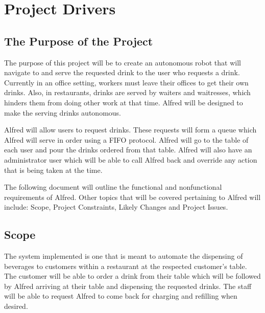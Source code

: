 \documentclass [11pt]{article}
\begin{document}
\pagebreak



\section {\textbf{Project Drivers}}

\subsection{The Purpose of the Project} 
The purpose of this project will be to create an autonomous robot that will navigate to and serve the requested drink to the user who requests a drink. Currently in an office setting, workers must leave their offices to get their own drinks. Also, in restaurants, drinks are served by waiters and waitresses, which hinders them from doing other work at that time. Alfred will be designed to make the serving drinks autonomous. \newline

Alfred will allow users to request drinks. These requests will form a queue which Alfred will serve in order using a FIFO protocol. Alfred will go to the table of each user and pour the drinks ordered from that table. Alfred will also have an administrator user which will be able to call Alfred back and override any action that is being taken at the time.\newline

The following document will outline the functional and nonfunctional requirements of Alfred.  Other topics that will be covered pertaining to Alfred will include: Scope, Project Constraints, Likely Changes and Project Issues.

\subsection{Scope}
The system implemented is one that is meant to automate the dispensing of beverages to customers within a restaurant at the respected customer’s table. The customer will be able to order a drink from their table which will be followed by Alfred arriving at their table and dispensing the requested drinks. The staff will be able to request Alfred to come back for charging and refilling when desired. 
\end{document}
